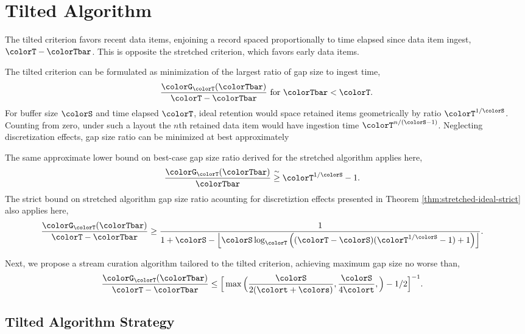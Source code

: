 \section{Tilted Algorithm} \label{sec:tilted}

The tilted criterion favors recent data items, enjoining a record spaced proportionally to time elapsed since data item ingest, $\colorT - \colorTbar$.
This is opposite the stretched criterion, which favors early data items.

The tilted criterion can be formulated as minimization of the largest ratio of gap size to ingest time,
\begin{align*}
\frac{\colorG_{\colorT}(\colorTbar)}{\colorT - \colorTbar} \text{ for } \colorTbar < \colorT.
\end{align*}
For buffer size $\colorS$ and time elapsed $\colorT$, ideal retention would space retained items geometrically by ratio $\colorT^{1/\colorS}$.
Counting from zero, under such a layout the $n$th retained data item would have ingestion time $\colorT^{n/(\colorS - 1)}$.
Neglecting discretization effects, gap size ratio can be minimized at best approximately

The same approximate lower bound on best-case gap size ratio derived for the stretched algorithm applies here,
\begin{align*}
\frac{\colorG_{\colorT}(\colorTbar)}{\colorTbar}
&\stackrel{\sim}{\geq}
\colorT^{1/\colorS} - 1.
\end{align*}
The strict bound on stretched algorithm gap size ratio acounting for discretiztion effects presented in Theorem \ref{thm:stretched-ideal-strict} also applies here,
\begin{align*}
\frac{\colorG_{\colorT}(\colorTbar)}{\colorT - \colorTbar}
&\geq
\frac{
  1
}{
  1 + \colorS
  - \left\lfloor \colorS \log_{\colorT}\Big(
    (\colorT - \colorS)(\colorT^{1/\colorS} - 1) + 1
  \Big)\right\rfloor
}.
\end{align*}

Next, we propose a stream curation algorithm tailored to the tilted criterion, achieving maximum gap size no worse than,
\begin{align*}
  \frac{\colorG_{\colorT}(\colorTbar)}{\colorT - \colorTbar}
  &\leq
  \Big[
    \max\Big(
      \frac{\colorS}{2(\colort + \colors)},
      \frac{\colorS}{4\colort},
    \Big)
    - 1/2
  \Big]^{-1}.
\end{align*}

\subsection{Tilted Algorithm Strategy}

